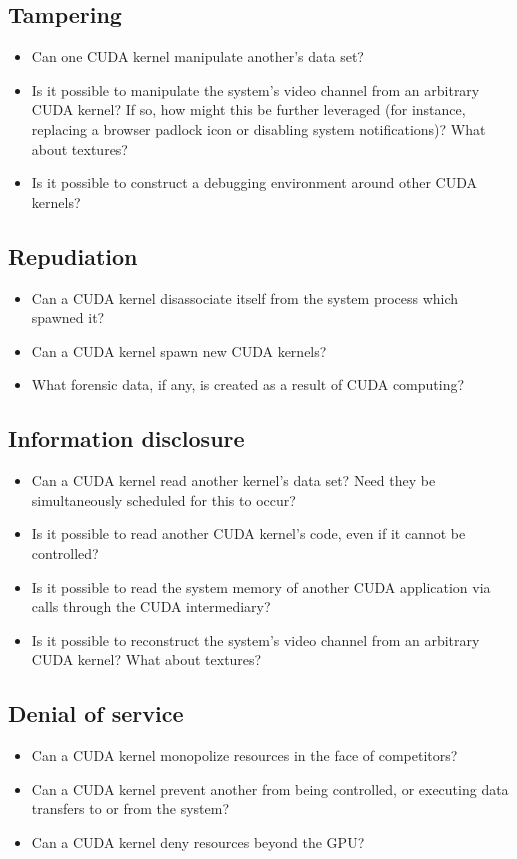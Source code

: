 \documentclass[letterpaper,10pt]{article}
\begin{document}
\begin{multicols}{2}
\subsection{Tampering}
\begin{itemize}
\item Can one CUDA kernel manipulate another's data set?
\item Is it possible to manipulate the system's video channel from an arbitrary
CUDA kernel? If so, how might this be further leveraged (for instance, replacing
a browser padlock icon or disabling system notifications)? What about textures?
\item Is it possible to construct a debugging environment around other CUDA kernels?
\end{itemize}
\subsection{Repudiation}
\begin{itemize}
\item Can a CUDA kernel disassociate itself from the system process which spawned it?
\item Can a CUDA kernel spawn new CUDA kernels?
\item What forensic data, if any, is created as a result of CUDA computing?
\end{itemize}
\subsection{Information disclosure}
\begin{itemize}
\item Can a CUDA kernel read another kernel's data set? Need they be simultaneously
scheduled for this to occur?
\item Is it possible to read another CUDA kernel's code, even if it cannot be
controlled?
\item Is it possible to read the system memory of another CUDA application via
calls through the CUDA intermediary?
\item Is it possible to reconstruct the system's video channel from an arbitrary
CUDA kernel? What about textures?
\end{itemize}
\subsection{Denial of service}
\begin{itemize}
\item Can a CUDA kernel monopolize resources in the face of competitors?
\item Can a CUDA kernel prevent another from being controlled, or executing
data transfers to or from the system?
\item Can a CUDA kernel deny resources beyond the GPU?
\end{itemize}

\end{multicols}
\end{document}
